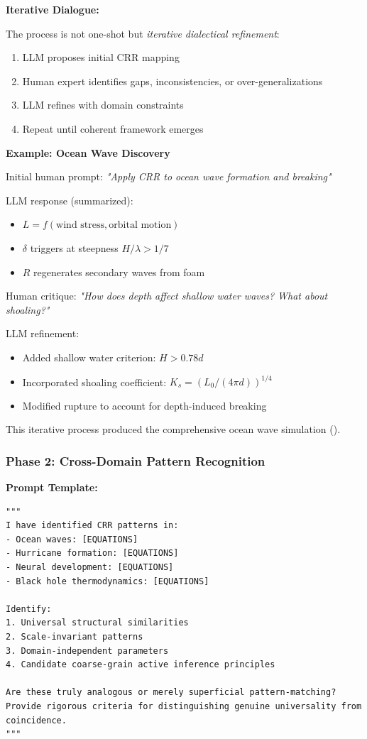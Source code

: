 \documentclass[11pt,a4paper]{article}
\theoremstyle{definition}
\theoremstyle{remark}
\begin{document}
\textbf{Iterative Dialogue:}

The process is not one-shot but \emph{iterative dialectical refinement}:
\begin{enumerate}
\item LLM proposes initial CRR mapping
\item Human expert identifies gaps, inconsistencies, or over-generalizations
\item LLM refines with domain constraints
\item Repeat until coherent framework emerges
\end{enumerate}

\textbf{Example: Ocean Wave Discovery}

Initial human prompt: \textit{"Apply CRR to ocean wave formation and breaking"}

LLM response (summarized):
\begin{itemize}
\item $L = f(\text{wind stress}, \text{orbital motion})$
\item $\delta$ triggers at steepness $H/\lambda > 1/7$
\item $R$ regenerates secondary waves from foam
\end{itemize}

Human critique: \textit{"How does depth affect shallow water waves? What about shoaling?"}

LLM refinement:
\begin{itemize}
\item Added shallow water criterion: $H > 0.78d$
\item Incorporated shoaling coefficient: $K_s = (L_0/(4\pi d))^{1/4}$
\item Modified rupture to account for depth-induced breaking
\end{itemize}

This iterative process produced the comprehensive ocean wave simulation ().

\subsubsection{Phase 2: Cross-Domain Pattern Recognition}

\textbf{Prompt Template:}
\begin{lstlisting}
"""
I have identified CRR patterns in:
- Ocean waves: [EQUATIONS]
- Hurricane formation: [EQUATIONS]
- Neural development: [EQUATIONS]
- Black hole thermodynamics: [EQUATIONS]

Identify:
1. Universal structural similarities
2. Scale-invariant patterns
3. Domain-independent parameters
4. Candidate coarse-grain active inference principles

Are these truly analogous or merely superficial pattern-matching?
Provide rigorous criteria for distinguishing genuine universality from coincidence.
"""
\end{lstlisting}
\end{document}

